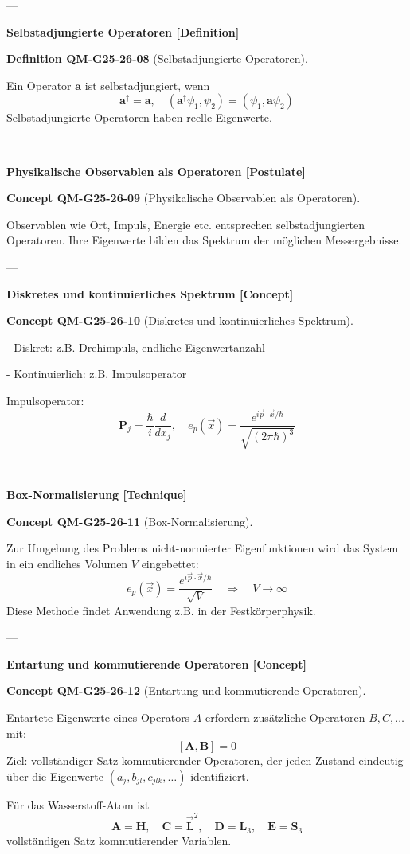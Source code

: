 \documentclass[10pt, letterpaper]{article}
\newcommand{\CustomHeading}[3]{%
  \par\medskip\noindent%
  \textbf{#1 #2} \textnormal{(#3)}.\enskip%
}
\newenvironment{DEF}[2]{\begin{unitbox}\CustomHeading{Definition}{#1}{#2}}{\end{unitbox}}
\newenvironment{CONC}[2]{\begin{unitbox}\CustomHeading{Concept}{#1}{#2}}{\end{unitbox}}
\begin{document}
---

\textbf{Selbstadjungierte Operatoren [Definition]}

\begin{DEF}{QM-G25-26-08}{Selbstadjungierte Operatoren}
Ein Operator $\mathbf{a}$ ist selbstadjungiert, wenn
\[
\mathbf{a}^\dagger = \mathbf{a}, \quad (\mathbf{a}^\dagger \psi_1, \psi_2) = (\psi_1, \mathbf{a} \psi_2)
\]
Selbstadjungierte Operatoren haben reelle Eigenwerte.
\end{DEF}

---

\textbf{Physikalische Observablen als Operatoren [Postulate]}

\begin{CONC}{QM-G25-26-09}{Physikalische Observablen als Operatoren}
Observablen wie Ort, Impuls, Energie etc. entsprechen selbstadjungierten Operatoren. Ihre Eigenwerte bilden das Spektrum der möglichen Messergebnisse.
\end{CONC}

---

\textbf{Diskretes und kontinuierliches Spektrum [Concept]}


\begin{CONC}{QM-G25-26-10}{Diskretes und kontinuierliches Spektrum}
- Diskret: z.B. Drehimpuls, endliche Eigenwertanzahl

- Kontinuierlich: z.B. Impulsoperator

Impulsoperator:
\[
\mathbf{P}_j = \frac{\hbar}{i} \frac{d}{dx_j}, \quad e_p(\vec{x}) = \frac{e^{i \vec{p} \cdot \vec{x}/\hbar}}{\sqrt{(2\pi\hbar)^3}}
\]
\end{CONC}

---

\textbf{Box-Normalisierung [Technique]}

\begin{CONC}{QM-G25-26-11}{Box-Normalisierung}
Zur Umgehung des Problems nicht-normierter Eigenfunktionen wird das System in ein endliches Volumen $V$ eingebettet:
\[
e_p(\vec{x}) = \frac{e^{i \vec{p} \cdot \vec{x}/\hbar}}{\sqrt{V}} \quad \Rightarrow \quad V \to \infty
\]
Diese Methode findet Anwendung z.B. in der Festkörperphysik.
\end{CONC}

---

\textbf{Entartung und kommutierende Operatoren [Concept]}


\begin{CONC}{QM-G25-26-12}{Entartung und kommutierende Operatoren}
Entartete Eigenwerte eines Operators $A$ erfordern zusätzliche Operatoren $B, C, \dots$ mit:
\[
[\mathbf{A}, \mathbf{B}] = 0
\]
Ziel: vollständiger Satz kommutierender Operatoren, der jeden Zustand eindeutig über die Eigenwerte $(a_j, b_{jl}, c_{jlk}, \dots)$ identifiziert.

Für das Wasserstoff-Atom ist
$$
\mathbf{A}=\mathbf{H}, \quad \mathbf{C}=\overrightarrow{\mathbf{L}}^{2}, \quad \mathbf{D}=\mathbf{L}_{3}, \quad \mathbf{E}=\mathbf{S}_{3}
$$
vollständigen Satz kommutierender Variablen.
\end{CONC}
\end{document}
